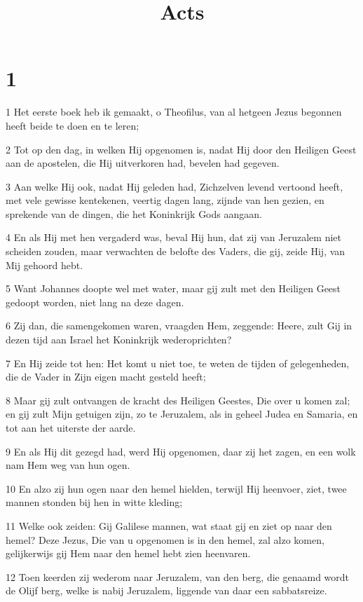 

\title{Acts}



\chapter{1}

\par 1 Het eerste boek heb ik gemaakt, o Theofilus, van al hetgeen Jezus begonnen heeft beide te doen en te leren;
\par 2 Tot op den dag, in welken Hij opgenomen is, nadat Hij door den Heiligen Geest aan de apostelen, die Hij uitverkoren had, bevelen had gegeven.
\par 3 Aan welke Hij ook, nadat Hij geleden had, Zichzelven levend vertoond heeft, met vele gewisse kentekenen, veertig dagen lang, zijnde van hen gezien, en sprekende van de dingen, die het Koninkrijk Gods aangaan.
\par 4 En als Hij met hen vergaderd was, beval Hij hun, dat zij van Jeruzalem niet scheiden zouden, maar verwachten de belofte des Vaders, die gij, zeide Hij, van Mij gehoord hebt.
\par 5 Want Johannes doopte wel met water, maar gij zult met den Heiligen Geest gedoopt worden, niet lang na deze dagen.
\par 6 Zij dan, die samengekomen waren, vraagden Hem, zeggende: Heere, zult Gij in dezen tijd aan Israel het Koninkrijk wederoprichten?
\par 7 En Hij zeide tot hen: Het komt u niet toe, te weten de tijden of gelegenheden, die de Vader in Zijn eigen macht gesteld heeft;
\par 8 Maar gij zult ontvangen de kracht des Heiligen Geestes, Die over u komen zal; en gij zult Mijn getuigen zijn, zo te Jeruzalem, als in geheel Judea en Samaria, en tot aan het uiterste der aarde.
\par 9 En als Hij dit gezegd had, werd Hij opgenomen, daar zij het zagen, en een wolk nam Hem weg van hun ogen.
\par 10 En alzo zij hun ogen naar den hemel hielden, terwijl Hij heenvoer, ziet, twee mannen stonden bij hen in witte kleding;
\par 11 Welke ook zeiden: Gij Galilese mannen, wat staat gij en ziet op naar den hemel? Deze Jezus, Die van u opgenomen is in den hemel, zal alzo komen, gelijkerwijs gij Hem naar den hemel hebt zien heenvaren.
\par 12 Toen keerden zij wederom naar Jeruzalem, van den berg, die genaamd wordt de Olijf berg, welke is nabij Jeruzalem, liggende van daar een sabbatsreize.
